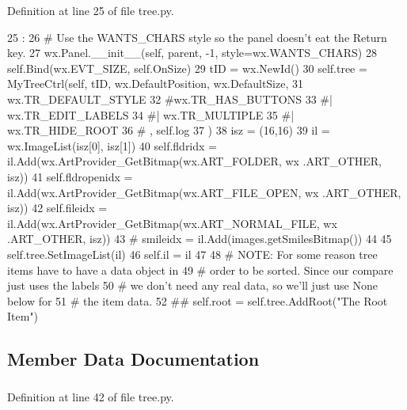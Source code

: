 Definition at line 25 of file tree.py.


\begin{DoxyCode}
25                               :
26         # Use the WANTS_CHARS style so the panel doesn't eat the Return key.
27         wx.Panel.__init__(self, parent, -1, style=wx.WANTS_CHARS)
28         self.Bind(wx.EVT_SIZE, self.OnSize)
29         tID = wx.NewId()
30         self.tree = MyTreeCtrl(self, tID, wx.DefaultPosition, wx.DefaultSize,
31                                wx.TR_DEFAULT_STYLE
32                                #wx.TR_HAS_BUTTONS
33                                #| wx.TR_EDIT_LABELS
34                                #| wx.TR_MULTIPLE
35                                #| wx.TR_HIDE_ROOT
36 #                               , self.log
37                                )
38         isz = (16,16)
39         il = wx.ImageList(isz[0], isz[1])
40         self.fldridx     = il.Add(wx.ArtProvider_GetBitmap(wx.ART_FOLDER,      wx
      .ART_OTHER, isz))
41         self.fldropenidx = il.Add(wx.ArtProvider_GetBitmap(wx.ART_FILE_OPEN,   wx
      .ART_OTHER, isz))
42         self.fileidx     = il.Add(wx.ArtProvider_GetBitmap(wx.ART_NORMAL_FILE, wx
      .ART_OTHER, isz))
43 #        smileidx    = il.Add(images.getSmilesBitmap())
44 
45         self.tree.SetImageList(il)
46         self.il = il
47 
48         # NOTE:  For some reason tree items have to have a data object in
49         #        order to be sorted.  Since our compare just uses the labels
50         #        we don't need any real data, so we'll just use None below for
51         #        the item data.
52 
##         self.root = self.tree.AddRoot("The Root Item")
\end{DoxyCode}


\subsection{Member Data Documentation}
\hypertarget{classtree_1_1TreeCtrlPanel_a070915afc92d6dc99cf4c05b584d23ff}{
\subsubsection[{fileidx}]{}}
\label{classtree_1_1TreeCtrlPanel_a070915afc92d6dc99cf4c05b584d23ff}


Definition at line 42 of file tree.py.\hypertarget{classtree_1_1TreeCtrlPanel_a89e5d0baeae1166731c338238dc1a685}{
\subsubsection[{fldridx}]{}}
\label{classtree_1_1TreeCtrlPanel_a89e5d0baeae1166731c338238dc1a685}


